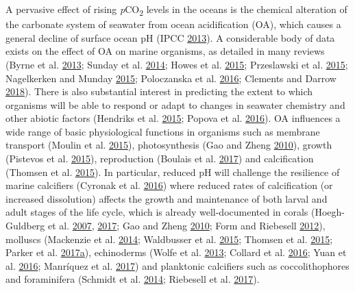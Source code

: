 \documentclass[a4paper,10pt, oneside]{memoir}
\begin{document}
A pervasive effect of rising \emph{p}CO\textsubscript{2} levels in the oceans is the chemical alteration of the carbonate system of seawater from ocean acidification (OA), which causes a general decline of surface ocean pH (IPCC \protect\hyperlink{ref-IPCC2013}{2013}).
A considerable body of data exists on the effect of OA on marine organisms, as detailed in many reviews (Byrne et al. \protect\hyperlink{ref-Byrne2013}{2013}; Sunday et al. \protect\hyperlink{ref-Sunday2014}{2014}; Howes et al. \protect\hyperlink{ref-Howes2015}{2015}; Przeslawski et al. \protect\hyperlink{ref-Przeslawski2015}{2015}; Nagelkerken and Munday \protect\hyperlink{ref-Nagelkerken2015}{2015}; Poloczanska et al. \protect\hyperlink{ref-Poloczanska2016}{2016}; Clements and Darrow \protect\hyperlink{ref-Clements2018}{2018}).
There is also substantial interest in predicting the extent to which organisms will be able to respond or adapt to changes in seawater chemistry and other abiotic factors (Hendriks et al. \protect\hyperlink{ref-Hendriks2015}{2015}; Popova et al. \protect\hyperlink{ref-Popova2016}{2016}).
OA influences a wide range of basic physiological functions in organisms such as membrane transport (Moulin et al. \protect\hyperlink{ref-Moulin2015}{2015}), photosynthesis (Gao and Zheng \protect\hyperlink{ref-Gao2010}{2010}), growth (Pistevos et al. \protect\hyperlink{ref-Pistevos2015}{2015}), reproduction (Boulais et al. \protect\hyperlink{ref-Boulais2017}{2017}) and calcification (Thomsen et al. \protect\hyperlink{ref-Thomsen2015}{2015}).
In particular, reduced pH will challenge the resilience of marine calcifiers (Cyronak et al. \protect\hyperlink{ref-Cyronak2016}{2016}) where reduced rates of calcification (or increased dissolution) affects the growth and maintenance of both larval and adult stages of the life cycle, which is already well-documented in corals (Hoegh-Guldberg et al. \protect\hyperlink{ref-Hoegh-Guldberg2007}{2007}, \protect\hyperlink{ref-Hoegh-Guldberg2017}{2017}; Gao and Zheng \protect\hyperlink{ref-Gao2010}{2010}; Form and Riebesell \protect\hyperlink{ref-Form2012}{2012}), molluscs (Mackenzie et al. \protect\hyperlink{ref-Mackenzie2014}{2014}; Waldbusser et al. \protect\hyperlink{ref-Waldbusser2015}{2015}; Thomsen et al. \protect\hyperlink{ref-Thomsen2015}{2015}; Parker et al. \protect\hyperlink{ref-Parker2017}{2017}\protect\hyperlink{ref-Parker2017}{a}), echinoderms (Wolfe et al. \protect\hyperlink{ref-Wolfe2013}{2013}; Collard et al. \protect\hyperlink{ref-Collard2016}{2016}; Yuan et al. \protect\hyperlink{ref-Yuan2016}{2016}; Manríquez et al. \protect\hyperlink{ref-Manriquez2017}{2017}) and planktonic calcifiers such as coccolithophores and foraminifera (Schmidt et al. \protect\hyperlink{ref-Schmidt2014}{2014}; Riebesell et al. \protect\hyperlink{ref-Riebesell2017}{2017}).
\end{document}
